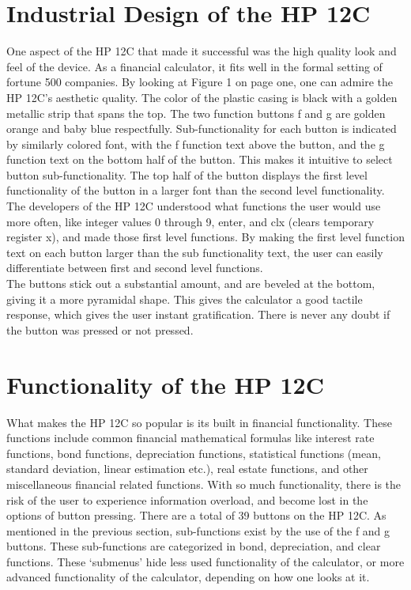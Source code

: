 \documentclass{article}
\begin{document}
\section{Industrial Design of the HP 12C}
\label{Industrial Design of the HP 12C}

One aspect of the HP 12C that made it successful was the high quality look and feel of the device.  As a financial calculator, it fits well in the formal setting of fortune 500 companies.  By looking at Figure 1 on page one, one can admire the HP 12C’s aesthetic quality.  The color of the plastic casing is black with a golden metallic strip that spans the top. The two function buttons f and g are golden orange and baby blue respectfully.  Sub-functionality for each button is indicated by similarly colored font, with the f function text above the button, and the g function text on the bottom half of the button.  This makes it intuitive to select button sub-functionality.  The top half of the button displays the first level functionality of the button in a larger font than the second level functionality.  The developers of the HP 12C understood what functions the user would use more often, like integer values 0 through 9, enter, and clx (clears temporary register x), and made those first level functions.  By making the first level function text on each button larger than the sub functionality text, the user can easily differentiate between first and second level functions.\\

The buttons stick out a substantial amount, and are beveled at the bottom, giving it a more pyramidal shape.  This gives the calculator a good tactile response, which gives the user instant gratification.  There is never any doubt if the button was pressed or not pressed.

\section{Functionality of the HP 12C}
\label{Functionality of the HP 12C}

What makes the HP 12C so popular is its built in financial functionality.  These functions include common financial mathematical formulas like interest rate functions, bond functions, depreciation functions, statistical functions (mean, standard deviation, linear estimation etc.), real estate functions, and other miscellaneous financial related functions.  With so much functionality, there is the risk of the user to experience information overload, and become lost in the options of button pressing.  There are a total of 39 buttons on the HP 12C. As mentioned in the previous section, sub-functions exist by the use of the f and g buttons.  These sub-functions are categorized in bond, depreciation, and clear functions.  These ‘submenus’ hide less used functionality of the calculator, or more advanced functionality of the calculator, depending on how one looks at it.
\end{document}
